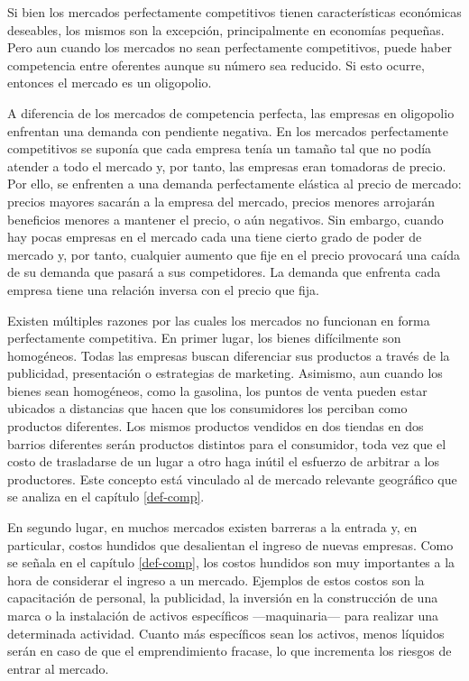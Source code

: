\documentclass[
  12pt,
  spanish,
]{book}
\begin{document}
Si bien los mercados perfectamente competitivos tienen características económicas deseables, los mismos son la excepción, principalmente en economías pequeñas. Pero aun cuando los mercados no sean perfectamente competitivos, puede haber competencia entre oferentes aunque su número sea reducido. Si esto ocurre, entonces el mercado es un oligopolio.

A diferencia de los mercados de competencia perfecta, las empresas en oligopolio enfrentan una demanda con pendiente negativa. En los mercados perfectamente competitivos se suponía que cada empresa tenía un tamaño tal que no podía atender a todo el mercado y, por tanto, las empresas eran tomadoras de precio. Por ello, se enfrenten a una demanda perfectamente elástica al precio de mercado: precios mayores sacarán a la empresa del mercado, precios menores arrojarán beneficios menores a mantener el precio, o aún negativos. Sin embargo, cuando hay pocas empresas en el mercado cada una tiene cierto grado de poder de mercado y, por tanto, cualquier aumento que fije en el precio provocará una caída de su demanda que pasará a sus competidores. La demanda que enfrenta cada empresa tiene una relación inversa con el precio que fija.

Existen múltiples razones por las cuales los mercados no funcionan en forma perfectamente competitiva. En primer lugar, los bienes difícilmente son homogéneos. Todas las empresas buscan diferenciar sus productos a través de la publicidad, presentación o estrategias de marketing. Asimismo, aun cuando los bienes sean homogéneos, como la gasolina, los puntos de venta pueden estar ubicados a distancias que hacen que los consumidores los perciban como productos diferentes. Los mismos productos vendidos en dos tiendas en dos barrios diferentes serán productos distintos para el consumidor, toda vez que el costo de trasladarse de un lugar a otro haga inútil el esfuerzo de arbitrar a los productores. Este concepto está vinculado al de mercado relevante geográfico que se analiza en el capítulo \ref{def-comp}.

En segundo lugar, en muchos mercados existen barreras a la entrada y, en particular, costos hundidos que desalientan el ingreso de nuevas empresas. Como se señala en el capítulo \ref{def-comp}, los costos hundidos son muy importantes a la hora de considerar el ingreso a un mercado. Ejemplos de estos costos son la capacitación de personal, la publicidad, la inversión en la construcción de una marca o la instalación de activos específicos ---maquinaria--- para realizar una determinada actividad. Cuanto más específicos sean los activos, menos líquidos serán en caso de que el emprendimiento fracase, lo que incrementa los riesgos de entrar al mercado.
\end{document}
